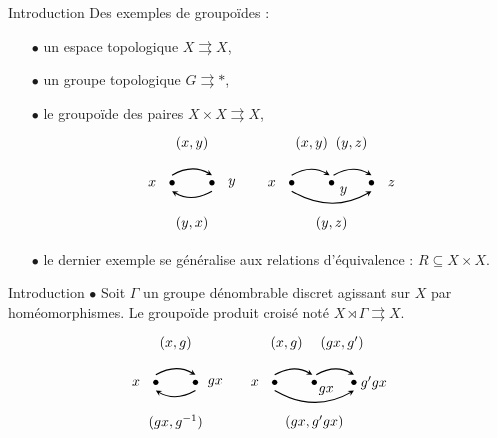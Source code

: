 \begin{frame}{Introduction}
Des exemples de groupoïdes :
\vspace{0.3 cm}
\begin{itemize}
\item[$\bullet$] un espace topologique $X\rightrightarrows X$,
\item[$\bullet$] un groupe topologique $G\rightrightarrows *$,
\item[$\bullet$] le groupoïde des paires $X\times X\rightrightarrows X$,
\[\begin{tikzpicture}
\draw  (-2,1) node {$(x,y)$};
\draw  (-2,-1) node {$(y,x)$};

\draw  (1,1) node {$(x,y)$};
\draw  (2,1) node {$(y,z)$};
\draw  (1.5,-1) node {$(y,z)$};

\draw [>=stealth, ->, thick] (-2.5,0.2) to[bend left] (-1.5,0.2);
\draw [>=stealth, ->,thick] (-1.5,-0.2) to[bend left] (-2.5,-0.2);

\draw [>=stealth, ->, thick] (0.5,0.2) to[bend left] (1.45,0.2);
\draw [>=stealth, ->, thick] (1.55,0.2) to[bend left] (2.5,0.2);
\draw [>=stealth, ->, thick] (0.5,-0.2) to[bend right] (2.5,-0.2);


\draw  (-2.5,0) node {$\bullet$};
\draw  (-1.5,0) node {$\bullet$};
\draw  (0.5,0) node {$\bullet$};
\draw  (1.5,0) node {$\bullet$};
\draw  (2.5,0) node {$\bullet$};

\draw  (-3,0) node {$x$};
\draw  (-1,0) node {$y$};
\draw  (0,0) node {$x$};
\draw  (1.8,-0.2) node {$y$};
\draw  (3,0) node {$z$};
\end{tikzpicture}\]
\item[$\bullet$] le dernier exemple se généralise aux relations d'équivalence : $R\subseteq X\times X$.
\end{itemize}
\end{frame}

\begin{frame}{Introduction}
$\bullet$ Soit $\Gamma$ un groupe dénombrable discret agissant sur $X$ par homéomorphismes. Le groupoïde produit croisé noté $X\rtimes \Gamma \rightrightarrows X$.
\[\begin{tikzpicture}
\draw  (-2,1) node {$(x,g)$};
\draw  (-2,-1) node {$(gx,g^{-1})$};

\draw  (0.8,1) node {$(x,g)$};
\draw  (2.2,1) node {$(gx,g')$};
\draw  (1.5,-1) node {$(gx,g'gx)$};

\draw [>=stealth, ->, thick] (-2.5,0.2) to[bend left] (-1.5,0.2);
\draw [>=stealth, ->,thick] (-1.5,-0.2) to[bend left] (-2.5,-0.2);

\draw [>=stealth, ->, thick] (0.5,0.2) to[bend left] (1.45,0.2);
\draw [>=stealth, ->, thick] (1.55,0.2) to[bend left] (2.5,0.2);
\draw [>=stealth, ->, thick] (0.5,-0.2) to[bend right] (2.5,-0.2);


\draw  (-2.5,0) node {$\bullet$};
\draw  (-1.5,0) node {$\bullet$};
\draw  (0.5,0) node {$\bullet$};
\draw  (1.5,0) node {$\bullet$};
\draw  (2.5,0) node {$\bullet$};

\draw  (-3,0) node {$x$};
\draw  (-1,0) node {$gx$};
\draw  (0,0) node {$x$};
\draw  (1.8,-0.2) node {$gx$};
\draw  (3,0) node {$g'gx$};
\end{tikzpicture}\]
\end{frame}

